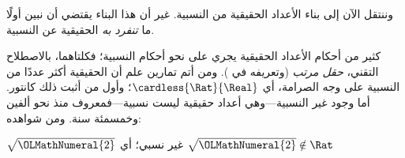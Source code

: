 \documentclass[../../../include/open-logic-section]{subfiles}
\begin{document}

وننتقل الآن إلى بناء الأعداد الحقيقية من النسبية. غير أن هذا البناء يقتضي أن نبين أولًا ما \emph{تنفرد به} الحقيقية عن النسبية.

كثير من أحكام الأعداد الحقيقية يجري على نحو أحكام النسبية؛ فكلتاهما، بالاصطلاح التقني، \emph{حقل مرتب} (وتعريفه في ). ومن أتم تمارين  علم أن الحقيقية أكثر عددًا من النسبية على وجه الصرامة، أي $\cardless{\Rat}{\Real}$؛ وأول من أثبت ذلك كانتور. أما وجود غير النسبية---وهي أعداد حقيقية ليست نسبية---فمعروف منذ نحو ألفين وخمسمئة سنة. ومن شواهده:
\begin{thm}
$\sqrt{\OLMathNumeral{2}}$ غير نسبي؛ أي $\sqrt{\OLMathNumeral{2}} \notin \Rat$
\end{thm}
\end{document}
